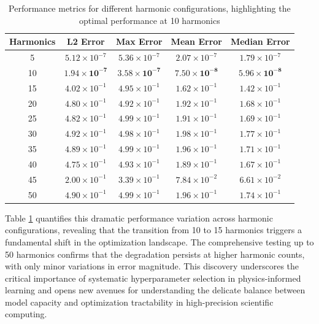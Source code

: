 \begin{table}[ht]
    \centering
    \caption{Performance metrics for different harmonic configurations, highlighting the optimal performance at 10 harmonics}
    \label{tab:harmonic_comparison}
    \begin{tabular}{|c|c|c|c|c|}
    \hline
    \textbf{Harmonics} & \textbf{L2 Error} & \textbf{Max Error} & \textbf{Mean Error} & \textbf{Median Error} \\ \hline
    5    & $5.12 \times 10^{-7}$ & $5.36 \times 10^{-7}$ & $2.07 \times 10^{-7}$ & $1.79 \times 10^{-7}$ \\ \hline
    10   & $\mathbf{1.94 \times 10^{-7}}$ & $\mathbf{3.58 \times 10^{-7}}$ & $\mathbf{7.50 \times 10^{-8}}$ & $\mathbf{5.96 \times 10^{-8}}$ \\ \hline
    15   & $4.02 \times 10^{-1}$ & $4.95 \times 10^{-1}$ & $1.62 \times 10^{-1}$ & $1.42 \times 10^{-1}$ \\ \hline
    20   & $4.80 \times 10^{-1}$ & $4.92 \times 10^{-1}$ & $1.92 \times 10^{-1}$ & $1.68 \times 10^{-1}$ \\ \hline
    25   & $4.82 \times 10^{-1}$ & $4.99 \times 10^{-1}$ & $1.91 \times 10^{-1}$ & $1.69 \times 10^{-1}$ \\ \hline
    30   & $4.92 \times 10^{-1}$ & $4.98 \times 10^{-1}$ & $1.98 \times 10^{-1}$ & $1.77 \times 10^{-1}$ \\ \hline
    35   & $4.89 \times 10^{-1}$ & $4.99 \times 10^{-1}$ & $1.96 \times 10^{-1}$ & $1.71 \times 10^{-1}$ \\ \hline
    40   & $4.75 \times 10^{-1}$ & $4.93 \times 10^{-1}$ & $1.89 \times 10^{-1}$ & $1.67 \times 10^{-1}$ \\ \hline
    45   & $2.00 \times 10^{-1}$ & $3.39 \times 10^{-1}$ & $7.84 \times 10^{-2}$ & $6.61 \times 10^{-2}$ \\ \hline
    50   & $4.90 \times 10^{-1}$ & $4.99 \times 10^{-1}$ & $1.96 \times 10^{-1}$ & $1.74 \times 10^{-1}$ \\ \hline
    \end{tabular}
\end{table}

Table \ref{tab:harmonic_comparison} quantifies this dramatic performance variation across harmonic configurations, revealing that the transition from 10 to 15 harmonics triggers a fundamental shift in the optimization landscape. The comprehensive testing up to 50 harmonics confirms that the degradation persists at higher harmonic counts, with only minor variations in error magnitude. This discovery underscores the critical importance of systematic hyperparameter selection in physics-informed learning and opens new avenues for understanding the delicate balance between model capacity and optimization tractability in high-precision scientific computing.

